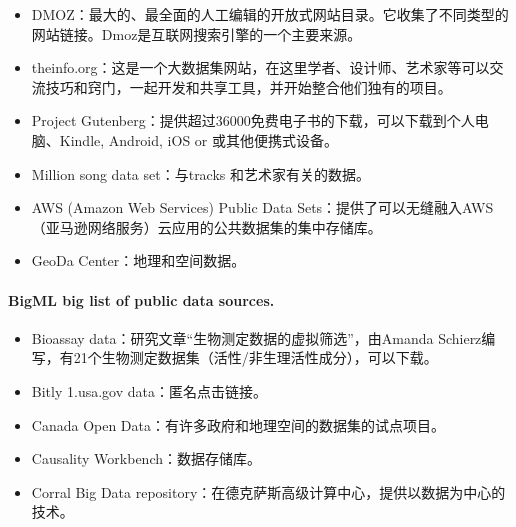 \documentclass[letterpaper,10pt,english]{sphinxmanual}
\begin{document}
\begin{itemize}
\item {} 
DMOZ：最大的、最全面的人工编辑的开放式网站目录。它收集了不同类型的网站链接。Dmoz是互联网搜索引擎的一个主要来源。

\item {} 
theinfo.org：这是一个大数据集网站，在这里学者、设计师、艺术家等可以交流技巧和窍门，一起开发和共享工具，并开始整合他们独有的项目。

\item {} 
Project Gutenberg：提供超过36000免费电子书的下载，可以下载到个人电脑、Kindle, Android, iOS or 或其他便携式设备。

\item {} 
Million song data set：与tracks 和艺术家有关的数据。

\item {} 
AWS (Amazon Web Services) Public Data Sets：提供了可以无缝融入AWS（亚马逊网络服务）云应用的公共数据集的集中存储库。

\item {} 
GeoDa Center：地理和空间数据。

\end{itemize}


\paragraph{BigML big list of public data sources.}
\label{opendatasource:bigml-big-list-of-public-data-sources}\begin{itemize}
\item {} 
Bioassay data：研究文章“生物测定数据的虚拟筛选”，由Amanda Schierz编写，有21个生物测定数据集（活性/非生理活性成分），可以下载。

\item {} 
Bitly 1.usa.gov data：匿名点击链接。

\item {} 
Canada Open Data：有许多政府和地理空间的数据集的试点项目。

\item {} 
Causality Workbench：数据存储库。

\item {} 
Corral Big Data repository：在德克萨斯高级计算中心，提供以数据为中心的技术。

\end{itemize}
\end{document}
